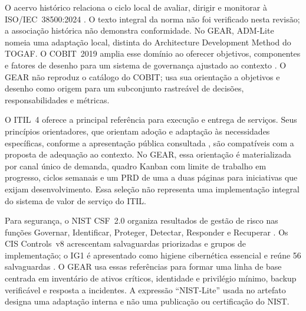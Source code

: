 O acervo histórico relaciona o ciclo local de avaliar, dirigir e monitorar à ISO/IEC~38500:2024 \citep{iso38500_2024}. O texto integral da norma não foi verificado nesta revisão; a associação histórica não demonstra conformidade. No GEAR, ADM-Lite nomeia uma adaptação local, distinta do Architecture Development Method do TOGAF. O COBIT~2019 amplia esse domínio ao oferecer objetivos, componentes e fatores de desenho para um sistema de governança ajustado ao contexto \citep{isaca2018cobit}. O GEAR não reproduz o catálogo do COBIT; usa sua orientação a objetivos e desenho como origem para um subconjunto rastreável de decisões, responsabilidades e métricas.

O ITIL~4 oferece a principal referência para execução e entrega de serviços. Seus princípios orientadores, que orientam adoção e adaptação às necessidades específicas, conforme a apresentação pública consultada \citep{peoplecert2026public}, são compatíveis com a proposta de adequação ao contexto. No GEAR, essa orientação é materializada por canal único de demanda, quadro Kanban com limite de trabalho em progresso, ciclos semanais e um PRD de uma a duas páginas para iniciativas que exijam desenvolvimento. Essa seleção não representa uma implementação integral do sistema de valor de serviço do ITIL.

Para segurança, o NIST CSF~2.0 organiza resultados de gestão de risco nas funções Governar, Identificar, Proteger, Detectar, Responder e Recuperar \citep{nist2024csf}. Os CIS Controls~v8 acrescentam salvaguardas priorizadas e grupos de implementação; o IG1 é apresentado como higiene cibernética essencial e reúne 56 salvaguardas \citep{cis2026ig1}. O GEAR usa essas referências para formar uma linha de base centrada em inventário de ativos críticos, identidade e privilégio mínimo, backup verificável e resposta a incidentes. A expressão ``NIST-Lite'' usada no artefato designa uma adaptação interna e não uma publicação ou certificação do NIST.

